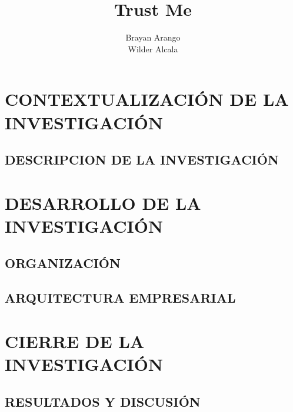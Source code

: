 \documentclass[12pt,letterpaper,oneside]{report}
\title{Trust Me}
\author{{Brayan Arango} \\ {Wilder Alcala}}
\begin{document}
	
	
	

	
	
	
	\tableofcontents
	\listoffigures
	
	
	
	\part{CONTEXTUALIZACIÓN DE LA INVESTIGACIÓN}
	
		\chapter{DESCRIPCION DE LA INVESTIGACIÓN}
			
			
			
			
			
			
			
			
	\part{DESARROLLO DE LA INVESTIGACIÓN}

		\chapter{ORGANIZACIÓN}
			
			
			
			
			
			
			
			
			
			
			
		\chapter{ARQUITECTURA EMPRESARIAL}
			
			
			

	\part{CIERRE DE LA INVESTIGACIÓN}

		\chapter*{RESULTADOS Y DISCUSIÓN}
			
\end{document}
